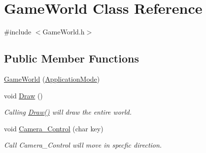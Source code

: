 \hypertarget{classGameWorld}{}\section{Game\+World Class Reference}
\label{classGameWorld}


{\ttfamily \#include $<$Game\+World.\+h$>$}

\subsection*{Public Member Functions}
\begin{DoxyCompactItemize}
\item 
\hyperlink{classGameWorld_a17a84e57a80600961088afc753036f89}{Game\+World} (\hyperlink{common_8h_add86e7c88dd109abea3f708b422f31f0}{Application\+Mode})
\item 
void \hyperlink{classGameWorld_a275418607d8286979b276f165ad5876b}{Draw} ()
\begin{DoxyCompactList}\small\item\em Calling \hyperlink{classGameWorld_a275418607d8286979b276f165ad5876b}{Draw()} will draw the entire world. \end{DoxyCompactList}\item 
void \hyperlink{classGameWorld_a43080b1c693798b12f7faf28a6b45ab5}{Camera\+\_\+\+Control} (char key)
\begin{DoxyCompactList}\small\item\em Call Camera\+\_\+\+Control will move in specfic direction. \end{DoxyCompactList}\end{DoxyCompactItemize}
